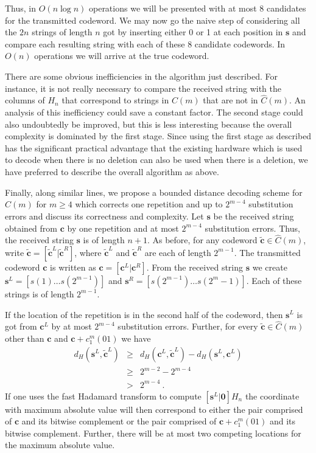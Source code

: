 Thus, in $O(n \log n)$ operations we will be presented with at
most $8$ candidates for the transmitted codeword. We may now go
the naive step of considering all the $2n$ strings of length $n$
got by inserting either 0 or 1 at each position in $\mathbf{s}$
and compare each resulting string with each of these $8$ candidate
codewords. In $O(n)$ operations we will arrive at the true
codeword.

There are some obvious inefficiencies in the algorithm just described.
For instance, it is not really necessary to compare the received
string with the columns of $H_n$ that correspond to strings in $C(m)$
that are not in $\hat{C}(m)$. An analysis of this inefficiency could
save a constant factor. The second stage could also undoubtedly
be improved, but this is less interesting because
the overall complexity is dominated by the
first stage. Since using the first stage as described has the
significant practical advantage that the
existing hardware which is used to decode when there is no deletion can
also be used when there is a deletion, we have preferred to describe
the overall algorithm as above.

Finally, along similar lines, we propose a bounded distance
decoding scheme for ${\hat C}(m)$ for $m \ge 4$ which corrects one
repetition and up to $2^{m-4}$ substitution errors and discuss its
correctness and complexity. Let $\mathbf{s}$ be the received
string obtained from $\mathbf{c}$ by one repetition and at most
$2^{m-4}$ substitution errors. Thus, the received string
$\mathbf{s}$ is of length $n+1$. As before, for any codeword
$\tilde{\mathbf{c}} \in \hat{C}(m)$, write $\tilde{\mathbf{c}} =
\left[ \tilde{\mathbf{c}}^L | \tilde{\mathbf{c}}^R \right]$, where
$\tilde{\mathbf{c}}^L$ and $\tilde{\mathbf{c}}^R$ are each of
length $2^{m-1}$. The transmitted codeword $\mathbf{c}$ is written
as $\mathbf{c} = \left[ \mathbf{c}^L | \mathbf{c}^R \right]$. From
the received string $\mathbf{s}$ we create $\mathbf{s}^L = \left[
s(1) \ldots s(2^{m-1}) \right]$ and $\mathbf{s}^R = \left[
s(2^{m-1}) \ldots s(2^m -1) \right]$. Each of these strings is of
length $2^{m-1}$.

If the location of the repetition is in the second
half of the codeword, then $\mathbf{s}^L$ is got from $\mathbf{c}^L$
by at most  $2^{m-4}$ substitution errors. Further, for every
$\tilde{\mathbf{c}} \in \hat{C}(m)$ other than $\mathbf{c}$ and
$\mathbf{c} + c_1^m(01)$ we have
\begin{eqnarray*}
d_H(\mathbf{s}^L, \tilde{\mathbf{c}}^L) &\ge &d_H(\mathbf{c}^L,
\tilde{\mathbf{c}}^L) - d_H(\mathbf{s}^L, \mathbf{c}^L) \\{}&\ge&
2^{m-2} - 2^{m-4} \\{}&>& 2^{m-4}~.
\end{eqnarray*}
If one uses the fast Hadamard transform to compute $\left[
\mathbf{s}^L | \mathbf{0} \right] H_n$ the coordinate with maximum
absolute value will then correspond to either the pair comprised
of $\mathbf{c}$ and its bitwise complement or the pair comprised
of $\mathbf{c} + c_1^m(01)$ and its bitwise complement. Further,
there will be at most two competing locations for the maximum
absolute value.

